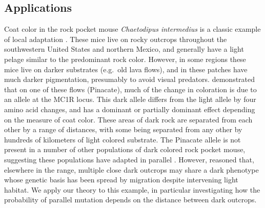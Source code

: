 \documentclass{article}
\newcommand{\citep}[1]{\cite{#1}}
\newcommand{\citet}[1]{\cite{#1}}
\begin{document}
\subsection{Applications} 
\label{ss:applications}

Coat color in the rock pocket mouse
\emph{Chaetodipus intermedius} is a classic example of local
adaptation 
\citep{benson1933concealing,DiceBlossom1937}.
These mice live on rocky outcrops throughout the southwestern United States and northern Mexico, 
and generally have a light pelage similar to the predominant rock color.
However, in some regions these mice live on darker substrates (e.g.\ old lava flows),
and in these patches have much darker pigmentation, 
presumably to avoid visual predators.
\citet{nachman2003genetic} demonstrated that on one of these flows (Pinacate), 
much of the change in coloration is due to an allele at the MC1R locus.
This dark allele differs from the light allele by four amino acid changes, 
and has a dominant or partially dominant effect depending on the measure of coat color.
These areas of dark rock are separated from each other by a range of distances, 
with some being separated from any other by hundreds of kilometers of light colored substrate. 
The Pinacate allele is not present in a number of other populations of dark colored rock pocket mouse, 
suggesting these populations have adapted in parallel \citep{nachman2003genetic,hoekstra2003different}.
However, \citet{hoekstra2004local} reasoned that, elsewhere in the range, 
multiple close dark outcrops may share a dark phenotype whose genetic basis has been spread by migration
despite intervening light habitat. 
We apply our theory to this example,
in particular investigating how the probability of parallel mutation depends on 
the distance between dark outcrops.
\end{document}

